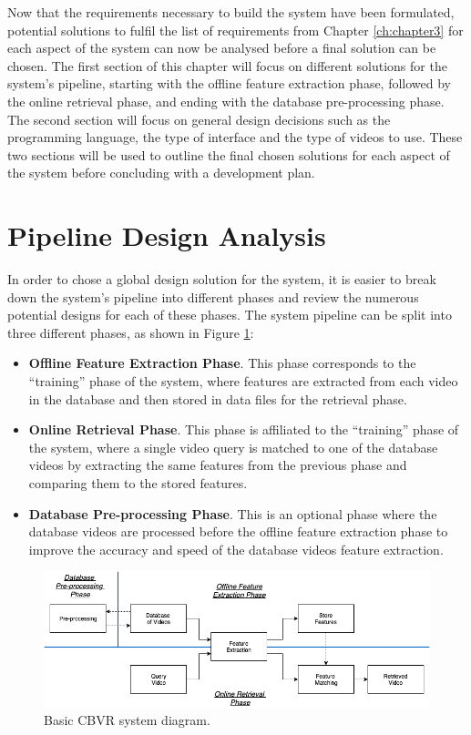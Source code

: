 Now that the requirements necessary to build the system have been formulated, potential solutions to fulfil the list of requirements from Chapter \ref{ch:chapter3} for each aspect of the system can now be analysed before a final solution can be chosen. The first section of this chapter will focus on different solutions for the system's pipeline, starting with the offline feature extraction phase, followed by the online retrieval phase, and ending with the database pre-processing phase. The second section will focus on general design decisions such as the programming language, the type of interface and the type of videos to use. These two sections will be used to outline the final chosen solutions for each aspect of the system before concluding with a development plan.

\section{Pipeline Design Analysis}

In order to chose a global design solution for the system, it is easier to break down the system's pipeline into different phases and review the numerous potential designs for each of these phases. The system pipeline can be split into three different phases, as shown in Figure \ref{fig:basic-cbvr-diagram}:

\begin{itemize}
    \item \textbf{Offline Feature Extraction Phase}. This phase corresponds to the ``training'' phase of the system, where features are extracted from each video in the database and then stored in data files for the retrieval phase.
    \item \textbf{Online Retrieval Phase}. This phase is affiliated to the ``training'' phase of the system, where a single video query is matched to one of the database videos by extracting the same features from the previous phase and comparing them to the stored features.
    \item \textbf{Database Pre-processing Phase}. This is an optional phase where the database videos are processed before the offline feature extraction phase to improve the accuracy and speed of the database videos feature extraction.
\end{itemize}

\begin{figure}[h]
\centerline{\includegraphics[width=\textwidth]{figures/design/basic_cbvr_phases.png}}
\caption{\label{fig:basic-cbvr-diagram}Basic CBVR system diagram.}
\end{figure}

